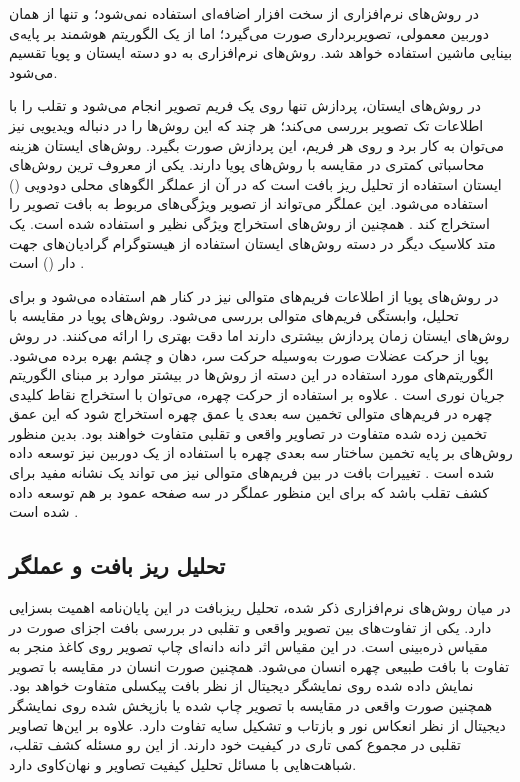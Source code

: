 در روش‌های نرم‌افزاری از سخت افزار اضافه‌ای استفاده نمی‌شود؛ و تنها از همان دوربین معمولی، تصویربرداری صورت می‌گیرد؛ اما از یک الگوریتم هوشمند بر پایه‌ی بینایی ماشین استفاده خواهد شد. روش‌های نرم‌افزاری به دو دسته ایستان و پویا تقسیم می‌شود.

در روش‌های ایستان، پردازش تنها روی یک فریم تصویر انجام می‌شود و تقلب را با اطلاعات تک تصویر بررسی می‌کند؛ هر چند که این روش‌ها را در دنباله ویدیویی نیز می‌توان به کار برد و روی هر فریم، این پردازش صورت بگیرد. روش‌های ایستان هزینه محاسباتی کمتری در مقایسه با روش‌های پویا دارند.  
یکی از معروف ترین روش‌های ایستان استفاده از تحلیل ریز بافت
 است که در آن از عملگر الگو‌های محلی دودویی 
 () 
 استفاده می‌شود. این عملگر می‌تواند از تصویر ویژگی‌های مربوط به بافت تصویر را استخراج کند
 \cite{maatta2011face,chingovska2012effectiveness}.
 همچنین از روش‌های استخراج ویژگی نظیر 
  \cite{7487030}
 و 
  \cite{7748511}
 استفاده شده است.
 یک متد کلاسیک دیگر در دسته روش‌های ایستان استفاده از هیستوگرام گرادیان‌های جهت دار
 () 
 است
 \cite{schwartz2011face,komulainen2013context,yang2013face}.

در روش‌های پویا از اطلاعات فریم‌های متوالی نیز در کنار هم استفاده می‌شود و برای تحلیل، وابستگی فریم‌های متوالی بررسی می‌شود. روش‌های پویا در مقایسه با روش‌های ایستان زمان پردازش بیشتری دارند اما دقت بهتری را ارائه می‌کنند. 
در روش پویا از حرکت عضلات صورت به‌وسیله حرکت سر، دهان و چشم بهره برده می‌شود. الگوریتم‌های مورد استفاده در این دسته از روش‌ها در بیشتر موارد بر مبنای الگوریتم جریان نوری 
است
\cite{yin2016face, anjos2014motion}.
علاوه بر استفاده از حرکت چهره، می‌توان با استخراج نقاط کلیدی چهره در فریم‌های متوالی تخمین سه بعدی یا عمق چهره استخراج شود که این عمق تخمین زده شده متفاوت در تصاویر واقعی و تقلبی متفاوت خواهند بود. بدین منظور روش‌های بر پایه تخمین ساختار سه بعدی چهره با استفاده از یک دوربین نیز توسعه داده شده است
\cite{wang2013face,de2012moving}.
 تغییرات بافت در بین فریم‌های متوالی نیز می ‌تواند یک نشانه مفید برای کشف تقلب باشد که برای این منظور عملگر 
در سه صفحه عمود بر هم توسعه داده شده است
\cite{freitas2012lbp}.
\subsection{تحلیل ریز بافت و عملگر }
در میان روش‌های نرم‌افزاری ذکر شده، تحلیل ریزبافت در این پایان‌نامه اهمیت بسزایی دارد. یکی از تفاوت‌های بین تصویر واقعی و تقلبی در بررسی بافت اجزای صورت در مقیاس ذره‌بینی
 است. در این مقیاس اثر دانه دانه‌ای چاپ تصویر روی کاغذ منجر به تفاوت با بافت طبیعی چهره انسان  می‌شود. همچنین صورت انسان در مقایسه با تصویر نمایش داده شده روی نمایشگر دیجیتال از نظر بافت پیکسلی متفاوت خواهد بود. همچنین صورت واقعی در مقایسه با تصویر چاپ شده یا بازپخش  شده روی نمایشگر دیجیتال از نظر انعکاس نور و بازتاب و تشکیل سایه تفاوت دارد. علاوه بر این‌ها تصاویر تقلبی در مجموع کمی تاری در کیفیت خود دارند. از این رو مسئله کشف تقلب، شباهت‌هایی با مسائل تحلیل کیفیت تصاویر و نهان‌کاوی دارد.

